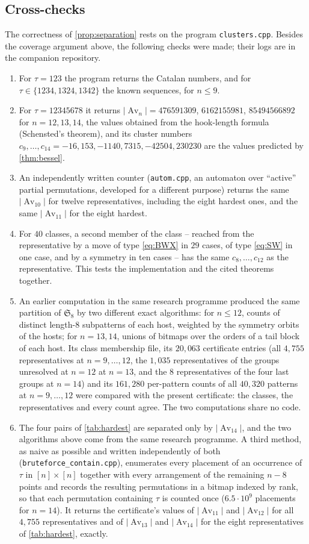 \documentclass[11pt,reqno]{amsart}
\theoremstyle{plain}
\theoremstyle{definition}
\theoremstyle{remark}
\newcommand{\Av}{\operatorname{Av}}
\newcommand{\Sym}{\mathfrak{S}}
\begin{document}
\subsection{Cross-checks}\label{sec:crosschecks}
The correctness of \cref{prop:separation} rests on the program \texttt{clusters.cpp}. Besides the coverage argument above, the following checks were made; their logs are in the companion repository.
\begin{enumerate}
\item For $\tau=123$ the program returns the Catalan numbers, and for $\tau\in\{1234,1324,1342\}$ the known sequences, for $n\le9$.
\item For $\tau=12345678$ it returns $|\Av_n|=476591309$, $6162155981$, $85494566892$ for $n=12,13,14$, the values obtained from the hook-length formula (Schensted's theorem), and its cluster numbers $c_9,\dots,c_{14}=-16,153,-1140,7315,-42504,230230$ are the values predicted by \cref{thm:bessel}.
\item An independently written counter (\texttt{autom.cpp}, an automaton over ``active'' partial permutations, developed for a different purpose) returns the same $|\Av_{10}|$ for twelve representatives, including the eight hardest ones, and the same $|\Av_{11}|$ for the eight hardest.
\item For $40$ classes, a second member of the class -- reached from the representative by a move of type \eqref{eq:BWX} in $29$ cases, of type \eqref{eq:SW} in one case, and by a symmetry in ten cases -- has the same $c_8,\dots,c_{12}$ as the representative. This tests the implementation and the cited theorems together.
\item An earlier computation in the same research programme produced the same partition of $\Sym_8$ by two different exact algorithms: for $n\le12$, counts of distinct length-$8$ subpatterns of each host, weighted by the symmetry orbits of the hosts; for $n=13,14$, unions of bitmaps over the orders of a tail block of each host. Its class membership file, its $20{,}063$ certificate entries (all $4{,}755$ representatives at $n=9,\dots,12$, the $1{,}035$ representatives of the groups unresolved at $n=12$ at $n=13$, and the $8$ representatives of the four last groups at $n=14$) and its $161{,}280$ per-pattern counts of all $40{,}320$ patterns at $n=9,\dots,12$ were compared with the present certificate: the classes, the representatives and every count agree. The two computations share no code.
\item The four pairs of \cref{tab:hardest} are separated only by $|\Av_{14}|$, and the two algorithms above come from the same research programme. A third method, as naive as possible and written independently of both (\texttt{bruteforce\_contain.cpp}), enumerates every placement of an occurrence of $\tau$ in $[n]\times[n]$ together with every arrangement of the remaining $n-8$ points and records the resulting permutations in a bitmap indexed by rank, so that each permutation containing $\tau$ is counted once ($6.5\cdot10^9$ placements for $n=14$). It returns the certificate's values of $|\Av_{11}|$ and $|\Av_{12}|$ for all $4{,}755$ representatives and of $|\Av_{13}|$ and $|\Av_{14}|$ for the eight representatives of \cref{tab:hardest}, exactly.

\end{enumerate}
\end{document}
